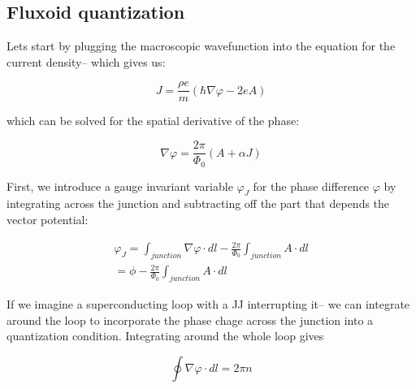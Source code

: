 \documentclass[paper=a4, twocolumn, fontsize=10pt]{article} %
\numberwithin{equation}{section} %
\numberwithin{figure}{section} %
\numberwithin{table}{section} %
\begin{document}
\subsection{Fluxoid quantization}

Lets start by plugging the macroscopic wavefunction into the equation for the current density-- which gives us:

\[ J = \frac{\rho e}{m} \left(\hbar\nabla \varphi - 2e A \right) \]

which can be solved for the spatial derivative of the phase:

\[ \nabla \varphi = \frac{2\pi}{\Phi_0} \left( A + \alpha J \right) \]


First, we introduce a gauge invariant variable $\varphi_J$ for the phase difference $\varphi$ by integrating across the junction and subtracting off the part that depends the vector potential:

\begin{align}
    \varphi_J = \int_{junction} \nabla \varphi \cdot dl -  \frac{2\pi}{\Phi_0} \int_{junction} A \cdot dl
    \\
    = \phi -  \frac{2\pi}{\Phi_0} \int_{junction} A \cdot dl
\end{align}

If we imagine a superconducting loop with a JJ interrupting it-- we can integrate around the loop to incorporate the phase chage across the junction into a quantization condition. Integrating around the whole loop gives

\[ \oint \nabla \varphi \cdot dl = 2\pi n\]
\end{document}
